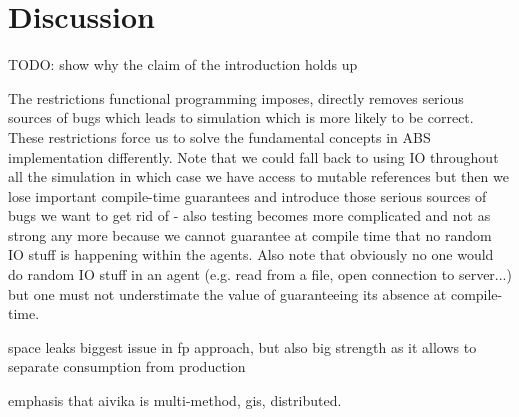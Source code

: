 \section{Discussion}
TODO: show why the claim of the introduction holds up

The restrictions functional programming imposes, directly removes serious sources of bugs which leads to simulation which is more likely to be correct. These restrictions force us to solve the fundamental concepts in ABS implementation differently. Note that we could fall back to using IO throughout all the simulation in which case we have access to mutable references but then we lose important compile-time guarantees and introduce those serious sources of bugs we want to get rid of - also testing becomes more complicated and not as strong any more because we cannot guarantee at compile time that no random IO stuff is happening within the agents. Also note that obviously no one would do random IO stuff in an agent (e.g. read from a file, open connection to server...) but one must not understimate the value of guaranteeing its absence at compile-time.

space leaks biggest issue in fp approach, but also big strength as it allows to separate consumption from production

emphasis that aivika is multi-method, gis, distributed. 